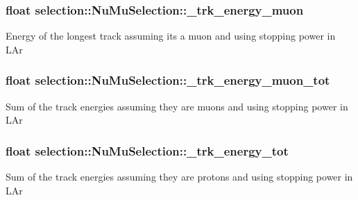 \subsubsection[{\texorpdfstring{\+\_\+trk\+\_\+energy\+\_\+muon}{_trk_energy_muon}}]{\setlength{\rightskip}{0pt plus 5cm}float selection\+::\+Nu\+Mu\+Selection\+::\+\_\+trk\+\_\+energy\+\_\+muon\hspace{0.3cm}{\ttfamily [private]}}\hypertarget{classselection_1_1NuMuSelection_ae223aabae94fb80e1e72b1392ceca16d}{}\label{classselection_1_1NuMuSelection_ae223aabae94fb80e1e72b1392ceca16d}
Energy of the longest track assuming it\textquotesingle{}s a muon and using stopping power in L\+Ar 
\subsubsection[{\texorpdfstring{\+\_\+trk\+\_\+energy\+\_\+muon\+\_\+tot}{_trk_energy_muon_tot}}]{\setlength{\rightskip}{0pt plus 5cm}float selection\+::\+Nu\+Mu\+Selection\+::\+\_\+trk\+\_\+energy\+\_\+muon\+\_\+tot\hspace{0.3cm}{\ttfamily [private]}}\hypertarget{classselection_1_1NuMuSelection_a09df11b06bf52eef27b8c748707ad991}{}\label{classselection_1_1NuMuSelection_a09df11b06bf52eef27b8c748707ad991}
Sum of the track energies assuming they are muons and using stopping power in L\+Ar 
\subsubsection[{\texorpdfstring{\+\_\+trk\+\_\+energy\+\_\+tot}{_trk_energy_tot}}]{\setlength{\rightskip}{0pt plus 5cm}float selection\+::\+Nu\+Mu\+Selection\+::\+\_\+trk\+\_\+energy\+\_\+tot\hspace{0.3cm}{\ttfamily [private]}}\hypertarget{classselection_1_1NuMuSelection_a62638e6a70986b1b5ae81a3cd80e4dc3}{}\label{classselection_1_1NuMuSelection_a62638e6a70986b1b5ae81a3cd80e4dc3}
Sum of the track energies assuming they are protons and using stopping power in L\+Ar 
